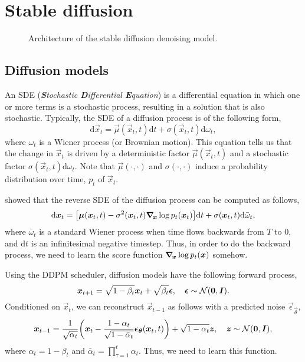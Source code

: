\section{Stable diffusion}

\begin{figure}
    \centering
    \caption{Architecture of the stable diffusion denoising model.}
    \label{fig:stable-diffusion-architecture}
\end{figure}

\subsection{Diffusion models}

An SDE (\textit{\textbf{S}tochastic \textbf{D}ifferential \textbf{E}quation}) is a differential
equation in which one or more terms is a stochastic process, resulting in a solution that is also
stochastic. Typically, the SDE of a diffusion process is of the following form, \[
    \mathrm{d}\vec{x}_t = \vec{\mu}(\vec{x}_t, t) \mathrm{d}t + \sigma(\vec{x}_t, t) \mathrm{d}\omega_t,
\]
where $\omega_t$ is a Wiener process (or Brownian motion). This equation tells us that
the change in $\vec{x}_t$ is driven by a deterministic factor $\vec{\mu}(\vec{x}_t,t)$ and a
stochastic factor $\sigma(\vec{x}_t, t) \mathrm{d}\omega_t$. Note that $\vec{\mu}(\cdot, \cdot)$
and $\sigma(\cdot, \cdot)$ induce a probability distribution over time, $p_t$ of $\vec{x}_t$.

\citet{anderson1982reverse} showed that the reverse SDE of the diffusion process can be computed as follows, \[
    \mathrm{d}\vec{x}_t = \lft[ \vec{\mu}(\vec{x}_t, t) - \sigma^2(\vec{x}_t, t) \grad{\log p_t(\vec{x}_t)}{\vec{x}} \rgt] \mathrm{d}t + \sigma(\vec{x}_t, t)\mathrm{d}\bar{\omega}_t,
\]
where $\bar{\omega}_t$ is a standard Wiener process when time flows backwards from $T$ to $0$, and
$\mathrm{d}t$ is an infinitesimal negative timestep. Thus, in order to do the backward process, we
need to learn the score function $\grad{\log p_t(\vec{x})}{\vec{x}}$ somehow.

Using the DDPM scheduler, diffusion models have the following forward process, \[
    \vec{x}_{t+1} = \sqrt{1-\beta_t} \vec{x}_t + \sqrt{\beta_t} \vec{\epsilon}, \quad \vec{\epsilon} \sim \mathcal{N}(\vec{0}, \mat{I}).
\]
Conditioned on $\vec{x}_t$, we can reconstruct $\vec{x}_{t-1}$ as follows with a predicted noise
$\vec{\epsilon}_{\vec{\theta}}$,
\begin{equation}
    \label{eq:denoising}
    \vec{x}_{t-1} = \frac{1}{\sqrt{\alpha_t}} \lft( \vec{x}_t - \frac{1-\alpha_t}{\sqrt{1 - \bar{\alpha}_t}} \vec{\epsilon}_{\vec{\theta}}(\vec{x}_t, t) \rgt) + \sqrt{1-\alpha_t} \vec{z}, \quad \vec{z} \sim \mathcal{N}(\vec{0}, \mat{I}),
\end{equation}
where $\alpha_t = 1 - \beta_t$ and $\bar{\alpha}_t = \prod_{\tau=1}^t \alpha_t$. Thus, we need to
learn this function.

